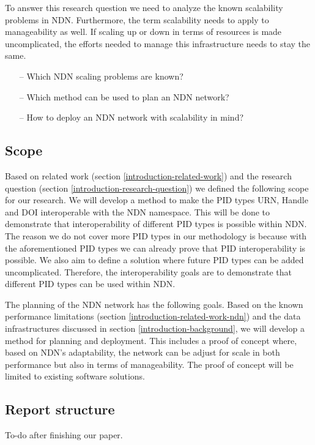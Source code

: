 To answer this research question we need to analyze the known scalability problems in NDN. Furthermore, the term scalability needs to apply to manageability as well. If scaling up or down in terms of resources is made uncomplicated, the efforts needed to manage this infrastructure needs to stay the same.
\begin{itemize}
    \item[--] Which NDN scaling problems are known?
    \item[--] Which method can be used to plan an NDN network?
    \item[--] How to deploy an NDN network with scalability in mind?
\end{itemize}

\subsection{Scope}
\label{introduction-scope}

Based on related work (section \ref{introduction-related-work}) and the research question (section \ref{introduction-research-question}) we defined the following scope for our research. We will develop a method to make the PID types URN, Handle and DOI interoperable with the NDN namespace. This will be done to demonstrate that interoperability of different PID types is possible within NDN. The reason we do not cover more PID types in our methodology is because with the aforementioned PID types we can already prove that PID interoperability is possible. We also aim to define a solution where future PID types can be added uncomplicated. Therefore, the interoperability goals are to demonstrate that different PID types can be used within NDN. 

The planning of the NDN network has the following goals. Based on the known performance limitations (section \ref{introduction-related-work-ndn}) and the data infrastructures discussed in section \ref{introduction-background}, we will develop a method for planning and deployment. This includes a proof of concept where, based on NDN's adaptability, the network can be adjust for scale in both performance but also in terms of manageability. The proof of concept will be limited to existing software solutions.

\subsection{Report structure}
To-do after finishing our paper.

